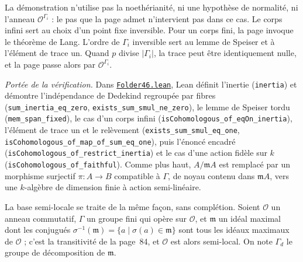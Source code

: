 La démonstration n'utilise pas la noethérianité, ni une hypothèse de normalité, ni l'anneau $\mathcal O^{\Gamma_i}$ : le pas que la page admet n'intervient pas dans ce cas. Le corps infini sert au choix d'un point fixe inversible. Pour un corps fini, la page invoque le théorème de Lang. L'ordre de $\Gamma_i$ inversible sert au lemme de Speiser et à l'élément de trace un. Quand $p$ divise $|\Gamma_i|$, la trace peut être identiquement nulle, et la page passe alors par $\mathcal O^{\Gamma_i}$.

\begin{sloppypar}
\begingroup\raggedright
\noindent\emph{Portée de la vérification.} Dans \href{\leanblob/RingTheory/Folder46.lean}{\texttt{Folder46.\allowbreak{}lean}}, Lean définit l'inertie (\texttt{inertia}) et démontre l'indépendance de Dedekind regroupée par fibres (\texttt{sum\_inertia\_eq\_zero}, \texttt{exists\_sum\_smul\_ne\_zero}), le lemme de Speiser tordu (\texttt{mem\_span\_fixed}), le cas d'un corps infini (\texttt{isCohomologous\_of\_eqOn\_inertia}), l'élément de trace un et le relèvement (\texttt{exists\_sum\_smul\_eq\_one}, \texttt{isCohomologous\_of\_map\_of\_sum\_eq\_one}), puis l'énoncé encadré (\texttt{isCohomologous\_of\_restrict\_inertia}) et le cas d'une action fidèle sur $k$ (\texttt{isCohomologous\_of\_faithful}). Comme plus haut, $A/\mathfrak mA$ est remplacé par un morphisme surjectif $\pi : A \to B$ compatible à $\Gamma$, de noyau contenu dans $\mathfrak mA$, vers une $k$-algèbre de dimension finie à action semi-linéaire.
\end{sloppypar}\par\endgroup

La base semi-locale se traite de la même façon, sans complétion. Soient $\mathcal O$ un anneau commutatif, $\Gamma$ un groupe fini qui opère sur $\mathcal O$, et $\mathfrak m$ un idéal maximal dont les conjugués $\sigma^{-1}(\mathfrak m) = \{a \mid \sigma(a) \in \mathfrak m\}$ sont tous les idéaux maximaux de $\mathcal O$ ; c'est la transitivité de la page~84, et $\mathcal O$ est alors semi-local. On note $\Gamma_d$ le groupe de décomposition de $\mathfrak m$.

